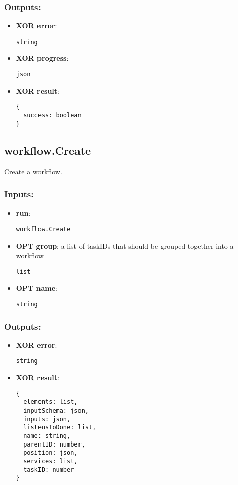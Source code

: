 \subsubsection*{Outputs:}
\begin{itemize}
    \item \textbf{XOR error}: 
\begin{lstlisting}
string
\end{lstlisting}
    \item \textbf{XOR progress}: 
\begin{lstlisting}
json
\end{lstlisting}
    \item \textbf{XOR result}: 
\begin{lstlisting}
{
  success: boolean
}
\end{lstlisting}
  \end{itemize}

\subsection{workflow.Create}
\label{ch:builtinservices:workflow.Create}
Create a workflow.
\subsubsection*{Inputs:}
\begin{itemize}
    \item \textbf{run}: 
\begin{lstlisting}
workflow.Create
\end{lstlisting}
    \item \textbf{OPT group}: a list of taskIDs that should be grouped together into a workflow
\begin{lstlisting}
list
\end{lstlisting}
    \item \textbf{OPT name}: 
\begin{lstlisting}
string
\end{lstlisting}
  \end{itemize}

\subsubsection*{Outputs:}
\begin{itemize}
    \item \textbf{XOR error}: 
\begin{lstlisting}
string
\end{lstlisting}
    \item \textbf{XOR result}: 
\begin{lstlisting}
{
  elements: list, 
  inputSchema: json, 
  inputs: json, 
  listensToDone: list, 
  name: string, 
  parentID: number, 
  position: json, 
  services: list, 
  taskID: number
}
\end{lstlisting}
  \end{itemize}

